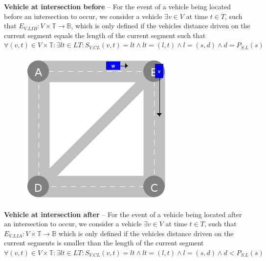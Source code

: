 \documentclass[graybox]{svmult}
\begin{document}
\noindent
\textbf{Vehicle at intersection before}
--
For the event of a vehicle being located before an intersection to occur, we consider a vehicle $\exists v \in V$ at time $t \in T$, such that $E_{V.LIB}: V \times \mathbb{T} \rightarrow \mathbb{B}$, which is only defined if the vehicles distance driven on the current segment equals the length of the current segment such that $\forall (v,t) \in V \times \mathbb{T}: \exists lt \in LT: S_{V.CL}(v,t) = lt \wedge lt = (l, t) \wedge l = (s, d) \wedge d = P_{S.L}(s)$
\vspace{4mm}
\begin{figure}
	\centering
		\includegraphics[scale=0.35]{../../events/vehicle-at-intersection-after.png}
\end{figure}

\noindent
\textbf{Vehicle at intersection after}
--
For the event of a vehicle being located after an intersection to occur, we consider a vehicle $\exists v \in V$ at time $t \in T$, such that $E_{V.LIA}: V \times \mathbb{T} \rightarrow \mathbb{B}$ which is only defined if the vehicles distance driven on the current segments is smaller than the length of the current segment $\forall (v,t) \in V \times \mathbb{T}: \exists lt \in LT: S_{V.CL}(v,t) = lt \wedge lt = (l, t) \wedge l = (s, d) \wedge d < P_{S.L}(s)$

\vspace{4mm}
\end{document}
